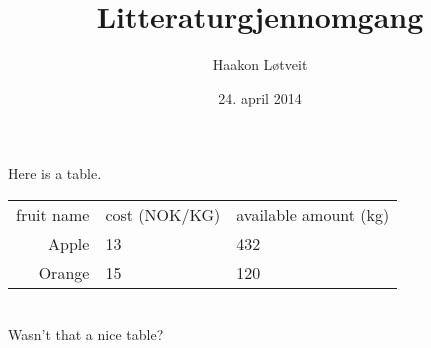 \documentclass[11pt]{article}
\begin{document}
\title{Litteraturgjennomgang}
\author{Haakon Løtveit}
\date{24. april 2014}
\maketitle

\label{sec:table}

Here is a table. \\
\begin{tabular}{r l l}
fruit name & cost (NOK/KG) & available amount (kg) \\
Apple & 13 & 432 \\
Orange & 15 & 120 \\
\end{tabular} \\
Wasn't that a nice table?
\end{document}
